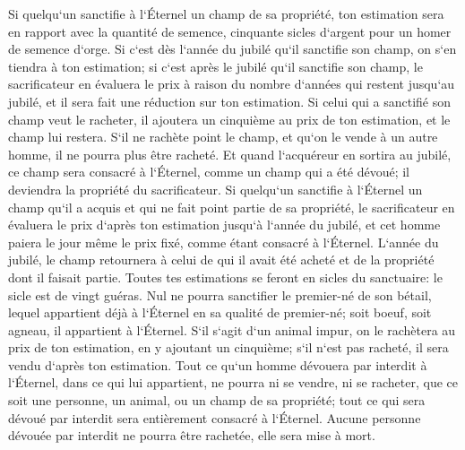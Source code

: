 \verse Si quelqu`un sanctifie à l`Éternel un champ de sa propriété, ton estimation sera en rapport avec la quantité de semence, cinquante sicles d`argent pour un homer de semence d`orge. 
\verse Si c`est dès l`année du jubilé qu`il sanctifie son champ, on s`en tiendra à ton estimation; 
\verse si c`est après le jubilé qu`il sanctifie son champ, le sacrificateur en évaluera le prix à raison du nombre d`années qui restent jusqu`au jubilé, et il sera fait une réduction sur ton estimation. 
\verse Si celui qui a sanctifié son champ veut le racheter, il ajoutera un cinquième au prix de ton estimation, et le champ lui restera. 
\verse S`il ne rachète point le champ, et qu`on le vende à un autre homme, il ne pourra plus être racheté. 
\verse Et quand l`acquéreur en sortira au jubilé, ce champ sera consacré à l`Éternel, comme un champ qui a été dévoué; il deviendra la propriété du sacrificateur. 
\verse Si quelqu`un sanctifie à l`Éternel un champ qu`il a acquis et qui ne fait point partie de sa propriété, 
\verse le sacrificateur en évaluera le prix d`après ton estimation jusqu`à l`année du jubilé, et cet homme paiera le jour même le prix fixé, comme étant consacré à l`Éternel. 
\verse L`année du jubilé, le champ retournera à celui de qui il avait été acheté et de la propriété dont il faisait partie. 
\verse Toutes tes estimations se feront en sicles du sanctuaire: le sicle est de vingt guéras. 
\verse Nul ne pourra sanctifier le premier-né de son bétail, lequel appartient déjà à l`Éternel en sa qualité de premier-né; soit boeuf, soit agneau, il appartient à l`Éternel. 
\verse S`il s`agit d`un animal impur, on le rachètera au prix de ton estimation, en y ajoutant un cinquième; s`il n`est pas racheté, il sera vendu d`après ton estimation. 
\verse Tout ce qu`un homme dévouera par interdit à l`Éternel, dans ce qui lui appartient, ne pourra ni se vendre, ni se racheter, que ce soit une personne, un animal, ou un champ de sa propriété; tout ce qui sera dévoué par interdit sera entièrement consacré à l`Éternel. 
\verse Aucune personne dévouée par interdit ne pourra être rachetée, elle sera mise à mort. 
